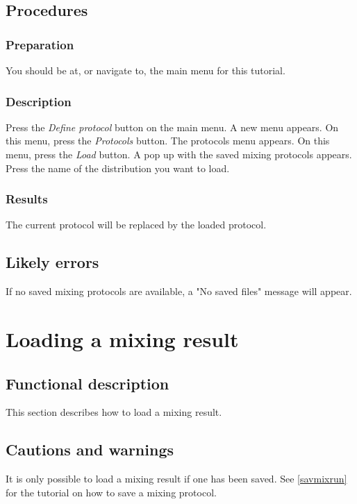 \subsection{Procedures}
\subsubsection{Preparation}
You should be at, or navigate to, the main menu for this tutorial.

\subsubsection{Description}
Press the \emph{Define protocol} button on the main menu. A new menu appears. On this menu, press the \emph{Protocols} button. The protocols menu appears. On this menu, press the \emph{Load} button. A pop up with the saved mixing protocols appears. Press the name of the distribution you want to load.

\subsubsection{Results}
The current protocol will be replaced by the loaded protocol.

\subsection{Likely errors}
If no saved mixing protocols are available, a "No saved files" message will appear. 


\section{Loading a mixing result}
\label{sec:loadMixResult}

\subsection{Functional description}
This section describes how to load a mixing result.

\subsection{Cautions and warnings}
It is only possible to load a mixing result if one has been saved. See \ref{savmixrun} for the tutorial on how to save a mixing protocol.

